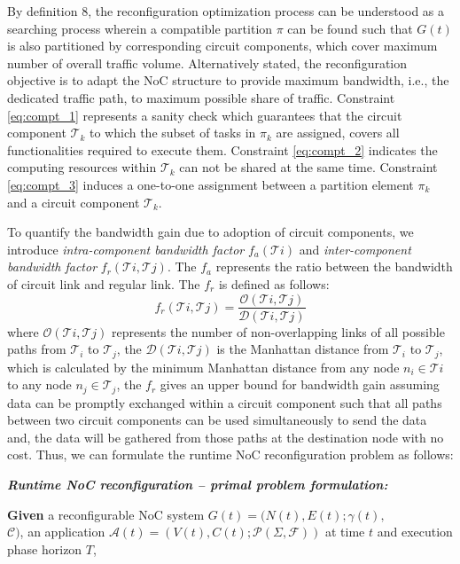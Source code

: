 {{By definition 8, the reconfiguration optimization process can be understood as a searching process wherein a compatible partition $\pi$ can be found such that $G(t)$ is also partitioned by corresponding circuit components, which cover maximum number of overall traffic volume. Alternatively stated, the reconfiguration objective is to adapt the NoC structure to provide maximum bandwidth, i.e., the dedicated traffic path, to maximum possible share of traffic. Constraint \eqref{eq:compt_1} represents a sanity check which guarantees that the circuit component $\mathcal T_{k}$ to which the subset of tasks in $\pi_{k}$ are assigned, covers all functionalities required to execute them. Constraint \eqref{eq:compt_2} indicates the computing resources within $\mathcal T_{k}$ can not be shared at the same time. Constraint \eqref{eq:compt_3} induces a one-to-one assignment between a partition element $\pi_{k}$ and a circuit component $\mathcal T_{k}$.

To quantify the bandwidth gain due to adoption of circuit components, we introduce \textit{intra-component bandwidth factor} $f_{a}(\mathcal T{i})$ and \textit{inter-component bandwidth factor} $f_{r}(\mathcal T{i},\mathcal T{j})$. The $f_{a}$ represents the ratio between the bandwidth of circuit link and regular link. The $f_{r}$ is defined as follows:
\begin{equation}\label{eq:fr}
f_r(\mathcal T{i},\mathcal T{j})=\frac{\mathcal O(\mathcal T{i},\mathcal T{j})}{\mathcal D(\mathcal T{i},\mathcal T{j})}
\end{equation}
where $\mathcal O(\mathcal T{i},\mathcal T{j})$ represents the number of non-overlapping links of all possible paths from $\mathcal T_{i}$ to $\mathcal T_{j}$, the $\mathcal D(\mathcal T{i},\mathcal T{j})$ is the Manhattan distance from $\mathcal T_{i}$ to $\mathcal T_{j}$, which is calculated by the minimum Manhattan distance from any node $n_i \in \mathcal T{i}$ to any node $n_j \in \mathcal T_{j}$, the $f_{r}$ gives an upper bound for bandwidth gain assuming data can be promptly exchanged within a circuit component such that all paths between two circuit components can be used simultaneously to send the data and, the data will be gathered from those paths at the destination node with no cost. Thus, we can formulate the runtime NoC reconfiguration problem as follows:

\noindent\textbf{\textit{Runtime NoC reconfiguration -- primal problem formulation:}}

\noindent\textbf{Given} a reconfigurable NoC system $G(t)=(N(t),E(t);\gamma(t),$\\$\mathcal C)$, an application $\mathcal A(t)=(V(t),C(t);\mathcal P(\Sigma,\mathcal F))$ at time $t$ and execution phase horizon $T$,

}}
